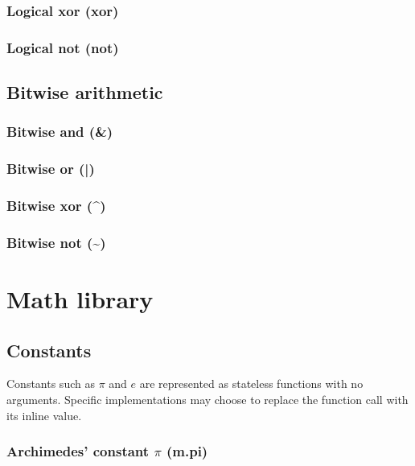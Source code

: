 \documentclass{article}
\theoremstyle{definition}
\begin{document}
\subsubsection{Logical xor (xor)}

\subsubsection{Logical not (not)}

\subsection{Bitwise arithmetic}

\subsubsection{Bitwise and (\&)}

\subsubsection{Bitwise or (|)}

\subsubsection{Bitwise xor (\^{})}

\subsubsection{Bitwise not (\textasciitilde{})}

\pagebreak

\section{Math library}

\subsection{Constants}

Constants such as $\pi$ and $e$ are represented as stateless functions with no arguments.  Specific implementations may choose to replace the function call with its inline value.

\subsubsection{Archimedes' constant $\pi$ (m.pi)}
\end{document}

